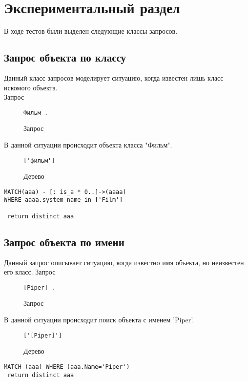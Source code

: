 \chapter{Экспериментальный раздел}
\label{cha:research}
В ходе тестов были выделен следующие классы запросов.
\section{Запрос объекта по классу}
Данный класс запросов моделирует ситуацию, когда известен лишь класс искомого объекта.\\
Запрос
\begin{figure}[!h]
\begin{tcolorbox}[colback=white, sharpish corners]
\begin{verbatim}
Фильм .
\end{verbatim}
\end{tcolorbox}
\caption{Запрос}
\end{figure}
В данной ситуации происходит объекта класса "Фильм".
\begin{figure}[!h]
\begin{tcolorbox}[colback=white, sharpish corners]
\begin{verbatim}
['фильм']
\end{verbatim}
\end{tcolorbox}
\caption{Дерево}
\end{figure}
\begin{lstlisting}[caption={Результат}]
MATCH(aaa) - [: is_a * 0..]->(aaaa)
WHERE aaaa.system_name in ['Film']

 return distinct aaa
\end{lstlisting}


\section{Запрос объекта по имени}
Данный запрос описывает ситуацию, когда известно имя объекта, но неизвестен его класс.
Запрос
\begin{figure}[!h]
\begin{tcolorbox}[colback=white, sharpish corners]
\begin{verbatim}
[Piper] .
\end{verbatim}
\end{tcolorbox}
\caption{Запрос}
\end{figure}
В данной ситуации происходит поиск объекта с именем 'Piper'.
\begin{figure}[!h]
\begin{tcolorbox}[colback=white, sharpish corners]
\begin{verbatim}
['[Piper]']
\end{verbatim}
\end{tcolorbox}
\caption{Дерево}
\end{figure}
\begin{lstlisting}[caption={Результат}]
MATCH (aaa) WHERE (aaa.Name='Piper')
 return distinct aaa
\end{lstlisting}


